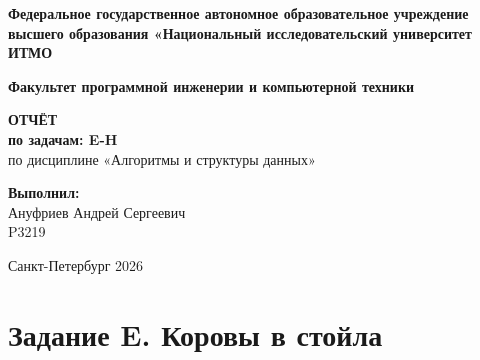 \documentclass[a4paper,12pt]{article}
\begin{document}
    \begin{titlepage}
        \begin{center}
            \textbf{Федеральное государственное автономное образовательное учреждение высшего образования «Национальный исследовательский университет ИТМО} \\
            \vspace{1cm}

            \textbf{Факультет программной инженерии и компьютерной техники} \\
            \vspace{1cm}

            \Large{\textbf{ОТЧЁТ}} \\
            \Large{\textbf{по задачам: E-H}} \\
            \large{по дисциплине «Алгоритмы и структуры данных»} \\
            \vspace{2cm}
        \end{center}

        \begin{flushright}
            \textbf{Выполнил:} \\
            Ануфриев Андрей Сергеевич \\
            P3219 \\
        \end{flushright}

        \vfill
        \begin{center}
            Санкт-Петербург 2026
        \end{center}
    \end{titlepage}

    \tableofcontents
    \newpage



    \section{Задание E. Коровы в стойла}

    
\end{document}
